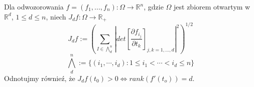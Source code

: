 \begin{defi}
	Dla odwozorowania $f = (f_1, ..., f_n): \Omega \rightarrow \mathbb{R}^n$, gdzie $\Omega$ jest zbiorem otwartym w $\mathbb{R}^d$, $1 \leq d \leq n$, niech $J_df: \Omega \rightarrow \mathbb{R}_+$ $$ 
	J_df := \left( \sum_{I \in \bigwedge_d^n} \left| det \left[ \frac{\partial f_{i_j}}{\partial t_k} \right]_{j,k=1,\dots,d} \right|^2 \right)^{1/2}
	$$
	$$
		\bigwedge_d^n := \{ (i_1, \cdots, i_d): 1 \leq i_1 < \cdots < i_d \leq n \}
	$$
	Odnotujmy równieź, że $J_df(t_0) > 0 \Leftrightarrow rank(f'(t_o))  =d$.
\end{defi}